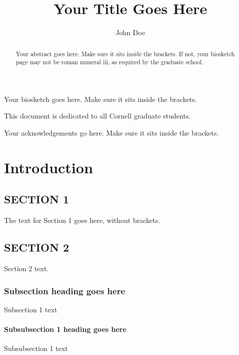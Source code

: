 \documentclass[phd,tocprelim]{cornell}
\title {Your Title Goes Here}
\author {John Doe}
\begin{document}
\maketitle
\makecopyright

\begin{abstract}
Your abstract goes here. Make sure it sits inside the brackets. If not,
your biosketch page may not be roman numeral iii, as required by the
graduate school.
\end{abstract}

\begin{biosketch}
Your biosketch goes here. Make sure it sits inside
the brackets.
\end{biosketch}

\begin{dedication}
This document is dedicated to all Cornell graduate students.
\end{dedication}

\begin{acknowledgements}
Your acknowledgements go here. Make sure it sits inside the brackets.
\end{acknowledgements}

\contentspage
\tablelistpage
\figurelistpage

\normalspacing \setcounter{page}{1} 
\pagestyle{cornell} \addtolength{\parskip}{0.5\baselineskip}

\chapter{Introduction}

\section{SECTION 1}
The text for Section 1 goes here, without brackets.

\section{SECTION 2}
Section 2 text.

\subsection{Subsection heading goes here}

Subsection 1 text

\subsubsection{Subsubsection 1 heading goes here}
Subsubsection 1 text
\end{document}
